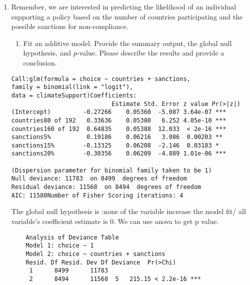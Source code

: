 \documentclass[12pt,letterpaper]{article}
\begin{document}
\begin{enumerate}
	\item
	Remember, we are interested in predicting the likelihood of an individual supporting a policy based on the number of countries participating and the possible sanctions for non-compliance.
	\begin{enumerate}
		\item [] Fit an additive model. Provide the summary output, the global null hypothesis, and $p$-value. Please describe the results and provide a conclusion.
	\end{enumerate}
		 
							\begin{lstlisting}	
Call:glm(formula = choice ~ countries + sanctions, 
family = binomial(link = "logit"),     
data = climateSupport)Coefficients:                    
							Estimate Std. Error z value Pr(>|z|)    
(Intercept)         -0.27266    0.05360  -5.087 3.64e-07 ***
countries80 of 192   0.33636    0.05380   6.252 4.05e-10 ***
countries160 of 192  0.64835    0.05388  12.033  < 2e-16 ***
sanctions5%          0.19186    0.06216   3.086  0.00203 ** 
sanctions15%        -0.13325    0.06208  -2.146  0.03183 *  
sanctions20%        -0.30356    0.06209  -4.889 1.01e-06 ***
            
(Dispersion parameter for binomial family taken to be 1)    
Null deviance: 11783  on 8499  degrees of freedom
Residual deviance: 11568  on 8494  degrees of freedom
AIC: 11580Number of Fisher Scoring iterations: 4								
		\end{lstlisting}
		
		The global null hypothesis is :none of the variable increase the model fit/ all variable's coefficient estimate is 0. 
		We can use anova to get p value.
		 
								\begin{lstlisting}	
	Analysis of Deviance Table
	Model 1: choice ~ 1
	Model 2: choice ~ countries + sanctions  
	Resid. Df Resid. Dev Df Deviance  Pr(>Chi)   
	 1      8499      11783                          
	 2      8494      11568  5   215.15 < 2.2e-16 ***
			

\end{lstlisting}
\end{enumerate}
\end{document}
